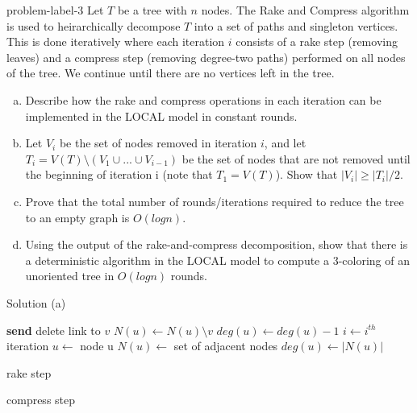 \begin{problem}{}{problem-label-3}
Let $T$ be a tree with $n$ nodes. The Rake and Compress
algorithm is used to heirarchically decompose $T$ into a set of paths and singleton vertices. This
is done iteratively where each iteration $i$ consists of a rake step (removing leaves) and a compress
step (removing degree-two paths) performed on all nodes of the tree. We continue until there
are no vertices left in the tree.
\begin{enumerate}[(a)]
	\item Describe how the rake and compress operations in each iteration can be implemented in
	the LOCAL model in constant rounds.
	\item Let $V_i$ be the set of nodes removed in iteration $i$, and let $T_i = V (T)\setminus (V_1\cup ...\cup V_{i-1})$ be the
	set of nodes that are not removed until the beginning of iteration i (note that $T_1 = V (T)$).
	Show that $|V_i| \geq |T_i|/2$.
	\item Prove that the total number of rounds/iterations required to reduce the tree to an empty graph is $O(log n)$.
	\item Using the output of the rake-and-compress decomposition, show that there is a deterministic algorithm in the LOCAL model to compute a 3-coloring of an unoriented tree in $O(log n)$ rounds.
\end{enumerate}
\end{problem}

\begin{solution*}{Solution (a)}{}
	\begin{algorithmic}
		\State \textbf{send} delete link to $v$
		\EndFor
	\EndFunction
	\newline
			\State $N(u) \gets N(u)\setminus v$
			\State $deg(u) \gets deg(u) -1$
		\EndIf
	\EndFor
	\EndFunction
	\newline
	\State $ i \gets i^{th}$ iteration
	\State $ u \gets$ node u
	\State $ N(u) \gets$ set of adjacent nodes
	\State $ deg(u) \gets |N(u)|$

	\Comment rake step
		\State {}
	\EndIf

	\Comment compress step
		\State {}
	\EndIf
	\State {}
	\end{algorithmic}
\end{solution*}

